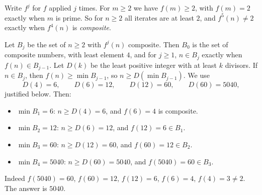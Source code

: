 Write $f^j$ for $f$ applied $j$ times. For $m\ge2$ we have $f(m)\ge2$, with $f(m)=2$ exactly when $m$ is prime. So for $n\ge2$ all iterates are at least $2$, and $f^5(n)\ne2$ exactly when $f^4(n)$ is \emph{composite}.

Let $B_j$ be the set of $n\ge2$ with $f^j(n)$ composite. Then $B_0$ is the set of composite numbers, with least element $4$, and for $j\ge1$, $n\in B_j$ exactly when $f(n)\in B_{j-1}$. Let $D(k)$ be the least positive integer with at least $k$ divisors. If $n\in B_j$, then $f(n)\ge\min B_{j-1}$, so $n\ge D\left(\min B_{j-1}\right)$. We use
\[D(4)=6,\qquad D(6)=12,\qquad D(12)=60,\qquad D(60)=5040,\]
justified below. Then:
\begin{itemize}
\item $\min B_1=6$: $n\ge D(4)=6$, and $f(6)=4$ is composite.
\item $\min B_2=12$: $n\ge D(6)=12$, and $f(12)=6\in B_1$.
\item $\min B_3=60$: $n\ge D(12)=60$, and $f(60)=12\in B_2$.
\item $\min B_4=5040$: $n\ge D(60)=5040$, and $f(5040)=60\in B_3$.
\end{itemize}
Indeed $f(5040)=60$, $f(60)=12$, $f(12)=6$, $f(6)=4$, $f(4)=3\ne2$. The answer is $\boxed{5040}$.

